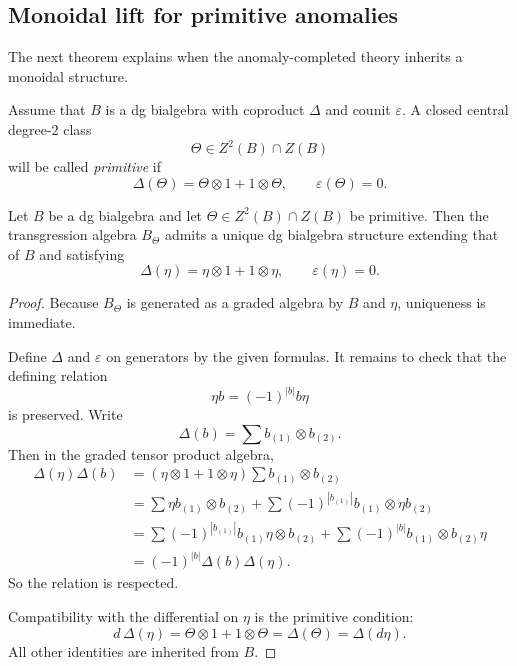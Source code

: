 \subsection{Monoidal lift for primitive anomalies}

The next theorem explains when the anomaly-completed theory inherits a monoidal structure.

\begin{definition}
Assume that \(B\) is a dg bialgebra with coproduct \(\Delta\) and counit \(\varepsilon\).
A closed central degree-\(2\) class
\[
\Theta\in Z^{2}(B)\cap Z(B)
\]
will be called \emph{primitive} if
\[
\Delta(\Theta)=\Theta\otimes 1+1\otimes \Theta,
\qquad
\varepsilon(\Theta)=0.
\]
\end{definition}

\begin{theorem}
Let \(B\) be a dg bialgebra and let \(\Theta\in Z^{2}(B)\cap Z(B)\) be primitive.
Then the transgression algebra \(B_{\Theta}\) admits a unique dg bialgebra structure extending that of \(B\) and satisfying
\[
\Delta(\eta)=\eta\otimes 1+1\otimes \eta,
\qquad
\varepsilon(\eta)=0.
\]
\end{theorem}

\begin{proof}
Because \(B_{\Theta}\) is generated as a graded algebra by \(B\) and \(\eta\), uniqueness is immediate.

Define \(\Delta\) and \(\varepsilon\) on generators by the given formulas.
It remains to check that the defining relation
\[
\eta b=(-1)^{|b|}b\eta
\]
is preserved.
Write
\[
\Delta(b)=\sum b_{(1)}\otimes b_{(2)}.
\]
Then in the graded tensor product algebra,
\begin{align*}
\Delta(\eta)\Delta(b)
&=
(\eta\otimes 1+1\otimes \eta)\sum b_{(1)}\otimes b_{(2)}
\\
&=
\sum \eta b_{(1)}\otimes b_{(2)}+\sum (-1)^{|b_{(1)}|}b_{(1)}\otimes \eta b_{(2)}
\\
&=
\sum (-1)^{|b_{(1)}|}b_{(1)}\eta\otimes b_{(2)}
+\sum (-1)^{|b|}b_{(1)}\otimes b_{(2)}\eta
\\
&=
(-1)^{|b|}\Delta(b)\Delta(\eta).
\end{align*}
So the relation is respected.

Compatibility with the differential on \(\eta\) is the primitive condition:
\[
d\,\Delta(\eta)
=
\Theta\otimes 1+1\otimes \Theta
=
\Delta(\Theta)
=
\Delta(d\eta).
\]
All other identities are inherited from \(B\).
\end{proof}

